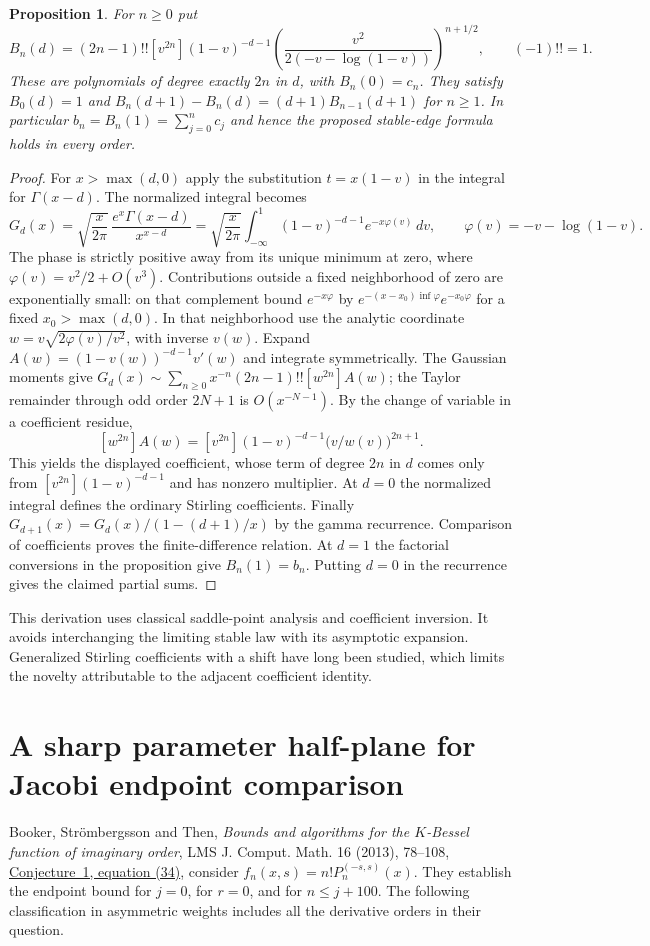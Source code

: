 \documentclass[11pt,a4paper]{article}
\newtheorem{proposition}[theorem]{Proposition}
\numberwithin{equation}{section}
\begin{document}
\begin{proposition}
For $n\ge0$ put
\[
 B_n(d)=(2n-1)!![v^{2n}](1-v)^{-d-1}
 \left(\frac{v^2}{2(-v-\log(1-v))}\right)^{n+1/2},
 \qquad (-1)!!=1 .
\]
These are polynomials of degree exactly $2n$ in $d$, with $B_n(0)=c_n$.
They satisfy $B_0(d)=1$ and
$B_n(d+1)-B_n(d)=(d+1)B_{n-1}(d+1)$ for $n\ge1$.
In particular $b_n=B_n(1)=\sum_{j=0}^n c_j$ and hence the proposed
stable-edge formula holds in every order.
\end{proposition}
\begin{proof}
For $x>\max(d,0)$ apply the substitution $t=x(1-v)$
in the integral for $\Gamma(x-d)$. The normalized integral becomes
\[
 G_d(x)=\sqrt{\frac{x}{2\pi}}\,\frac{e^x\Gamma(x-d)}{x^{x-d}}
 =\sqrt{\frac{x}{2\pi}}\int_{-\infty}^{1}
 (1-v)^{-d-1} e^{-x\varphi(v)}\,dv,\qquad
 \varphi(v)=-v-\log(1-v).
\]
The phase is strictly positive away from its unique minimum at zero,
where $\varphi(v)=v^2/2+O(v^3)$. Contributions outside a fixed
neighborhood of zero are exponentially small: on that complement
bound $e^{-x\varphi}$ by $e^{-(x-x_0)\inf\varphi}e^{-x_0\varphi}$
for a fixed $x_0>\max(d,0)$. In that neighborhood use the analytic
coordinate $w=v\sqrt{2\varphi(v)/v^2}$, with inverse $v(w)$.
Expand $A(w)=(1-v(w))^{-d-1}v'(w)$ and integrate symmetrically.
The Gaussian moments give $G_d(x)\sim\sum_{n\ge0}x^{-n}
(2n-1)!![w^{2n}]A(w)$; the Taylor remainder through odd order
$2N+1$ is $O(x^{-N-1})$. By the change of variable in a
coefficient residue,
\[
 [w^{2n}]A(w)=[v^{2n}](1-v)^{-d-1}
 \bigl(v/w(v)\bigr)^{2n+1}.
\]
This yields the displayed coefficient, whose term of degree $2n$ in
$d$ comes only from $[v^{2n}](1-v)^{-d-1}$ and has nonzero multiplier.
At $d=0$ the normalized integral defines the ordinary Stirling coefficients.
Finally $G_{d+1}(x)=G_d(x)/(1-(d+1)/x)$ by the gamma recurrence.
Comparison of coefficients proves the finite-difference relation. At
$d=1$ the factorial conversions in the proposition give $B_n(1)=b_n$.
Putting $d=0$ in the recurrence gives the claimed partial sums.
\end{proof}
This derivation uses classical saddle-point analysis and coefficient
inversion. It avoids interchanging the limiting stable law with its
asymptotic expansion. Generalized Stirling coefficients with a shift
have long been studied, which limits the novelty attributable to the
adjacent coefficient identity.

\section{A sharp parameter half-plane for Jacobi endpoint comparison}
\label{sec:jacobi}
Booker, Str\"ombergsson and Then, \emph{Bounds and algorithms for the
$K$-Bessel function of imaginary order}, LMS J. Comput. Math. 16 (2013),
78--108, \href{https://doi.org/10.1112/S1461157013000028}{Conjecture~1,
equation (34)}, consider $f_n(x,s)=n!P_n^{(-s,s)}(x)$.
They establish the endpoint bound for $j=0$, for $r=0$, and for
$n\le j+100$. The following classification in asymmetric weights
includes all the derivative orders in their question.
\end{document}
